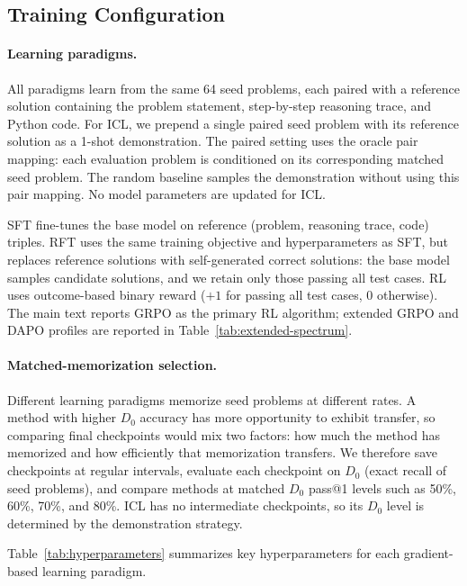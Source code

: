 \documentclass[]{bytedance_seed}
\theoremstyle{plain}
\theoremstyle{definition}
\theoremstyle{remark}
\begin{document}
\subsection{Training Configuration}
\label{app:training-config}

\paragraph{Learning paradigms.}
All paradigms learn from the same 64 seed problems, each paired with a reference solution containing the problem statement, step-by-step reasoning trace, and Python code. For ICL, we prepend a single paired seed problem with its reference solution as a 1-shot demonstration. The paired setting uses the oracle pair mapping: each evaluation problem is conditioned on its corresponding matched seed problem. The random baseline samples the demonstration without using this pair mapping. No model parameters are updated for ICL.

SFT fine-tunes the base model on reference (problem, reasoning trace, code) triples. RFT uses the same training objective and hyperparameters as SFT, but replaces reference solutions with self-generated correct solutions: the base model samples candidate solutions, and we retain only those passing all test cases. RL uses outcome-based binary reward ($+1$ for passing all test cases, $0$ otherwise). The main text reports GRPO as the primary RL algorithm; extended GRPO and DAPO profiles are reported in Table~\ref{tab:extended-spectrum}.

\paragraph{Matched-memorization selection.}
Different learning paradigms memorize seed problems at different rates. A method with higher $D_0$ accuracy has more opportunity to exhibit transfer, so comparing final checkpoints would mix two factors: how much the method has memorized and how efficiently that memorization transfers. We therefore save checkpoints at regular intervals, evaluate each checkpoint on $D_0$ (exact recall of seed problems), and compare methods at matched $D_0$ pass@1 levels such as 50\%, 60\%, 70\%, and 80\%. ICL has no intermediate checkpoints, so its $D_0$ level is determined by the demonstration strategy.

Table~\ref{tab:hyperparameters} summarizes key hyperparameters for each gradient-based learning paradigm.
\end{document}
